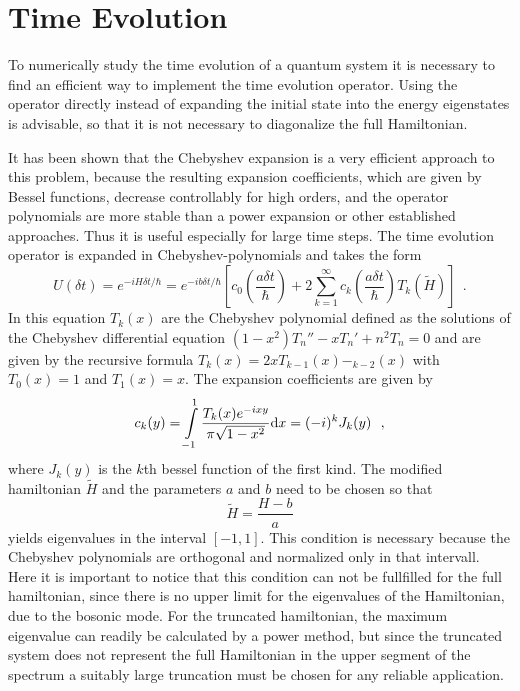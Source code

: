 \section{Time Evolution}
To numerically study the time evolution of a quantum system it is necessary to find an efficient way to implement the time evolution operator.
Using the operator directly instead of expanding the initial state into the energy eigenstates is advisable, so that it is not necessary to diagonalize the full Hamiltonian.

It has been shown that the Chebyshev expansion is a very efficient approach to this problem, because the resulting expansion coefficients, which are given by Bessel functions, decrease controllably for high orders, and the operator polynomials are more stable than a power expansion or other established approaches.
Thus it is useful especially for large time steps.
The time evolution operator is expanded in Chebyshev-polynomials and takes the form
\begin{equation}
  U(\delta t) = e^{-iH\delta t/\hbar} = e^{-ib\delta t/\hbar}\left[ c_0\left( \frac{a \delta t}{\hbar} \right) +2\sum\limits_{k=1}^{\infty} c_k\left(\frac{a \delta t}{\hbar}\right) T_k\left( \tilde H\right) \right]~~. \label{eq:timeevolution}
\end{equation}
In this equation $T_k(x)$ are the Chebyshev polynomial defined as the solutions of the Chebyshev differential equation $\left(1-x^2\right) T_n'' - x T_n' + n^2T_n= 0$ and are given by the recursive formula $T_k(x) = 2xT_{k-1}(x) - _{k-2}(x)$ with $T_0(x) = 1$ and $T_1(x) = x$.
The expansion coefficients are given by
\begin{equation}
  c_k(y) = \int\limits_{-1}^{1} \frac{T_k(x) e^{-ixy}}{\pi \sqrt{1-x^2}}\text d x = (-i)^k J_k(y)~~,
\end{equation}
where $J_k(y)$ is the $k$th bessel function of the first kind.
The modified hamiltonian $\tilde H$ and the parameters $a$ and $b$ need to be chosen so that 
\begin{equation}
  \tilde H = \frac{H-b}{a}
\end{equation}
yields eigenvalues in the interval $[-1,1]$.
This condition is necessary because the Chebyshev polynomials are orthogonal and normalized only in that intervall.
Here it is important to notice that this condition can not be fullfilled for the full hamiltonian, since there is no upper limit for the eigenvalues of the Hamiltonian, due to the bosonic mode.
For the truncated hamiltonian, the maximum eigenvalue can readily be calculated by a power method, but since the truncated system does not represent the full Hamiltonian in the upper segment of the spectrum a suitably large truncation must be chosen for any reliable application.
